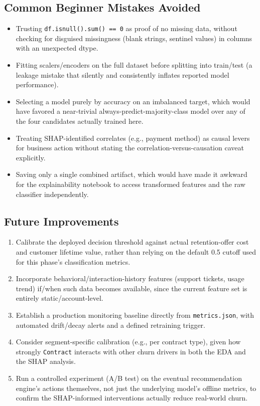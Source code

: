 \documentclass[11pt]{article}
\newcommand{\artifact}[1]{\texttt{\color{navy}#1}}
\begin{document}
\subsection{Common Beginner Mistakes Avoided}

\begin{itemize}[leftmargin=1.4em]
    \item Trusting \texttt{df.isnull().sum() == 0} as proof of no missing data, without checking for disguised missingness (blank strings, sentinel values) in columns with an unexpected dtype.
    \item Fitting scalers/encoders on the full dataset before splitting into train/test (a leakage mistake that silently and consistently inflates reported model performance).
    \item Selecting a model purely by accuracy on an imbalanced target, which would have favored a near-trivial always-predict-majority-class model over any of the four candidates actually trained here.
    \item Treating SHAP-identified correlates (e.g., payment method) as causal levers for business action without stating the correlation-versus-causation caveat explicitly.
    \item Saving only a single combined artifact, which would have made it awkward for the explainability notebook to access transformed features and the raw classifier independently.
\end{itemize}

\subsection{Future Improvements}

\begin{enumerate}[leftmargin=1.4em]
    \item Calibrate the deployed decision threshold against actual retention-offer cost and customer lifetime value, rather than relying on the default 0.5 cutoff used for this phase's classification metrics.
    \item Incorporate behavioral/interaction-history features (support tickets, usage trend) if/when such data becomes available, since the current feature set is entirely static/account-level.
    \item Establish a production monitoring baseline directly from \artifact{metrics.json}, with automated drift/decay alerts and a defined retraining trigger.
    \item Consider segment-specific calibration (e.g., per contract type), given how strongly \artifact{Contract} interacts with other churn drivers in both the EDA and the SHAP analysis.
    \item Run a controlled experiment (A/B test) on the eventual recommendation engine's actions themselves, not just the underlying model's offline metrics, to confirm the SHAP-informed interventions actually reduce real-world churn.
\end{enumerate}
\end{document}
